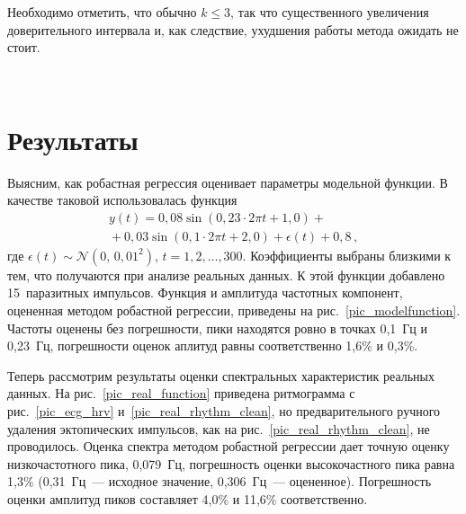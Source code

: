 \begin{multicols}{2}
Необходимо  отметить, что обычно $k\leq 3$, так что существенного
увеличения доверительного интервала и, как следствие, ухудшения
работы метода ожидать не стоит.

\begin{figure*} %
\vspace*{1pt}
\begin{center}
\mbox{%
\epsfxsize=156.767mm
}
\end{center}
\vspace*{-9pt}
\end{figure*}


\section{Результаты}%

Выясним, как робастная регрессия оценивает параметры модельной
функции. В качестве таковой использовалась функция
\begin{multline*}
y(t) = 0{,}08\sin\left ( 0{,}23\cdot2\pi t + 1{,}0\right )+{}\\
{}+ 0{,}03\sin\left ( 0{,}1\cdot2\pi t + 2{,}0 \right) +
\epsilon(t) + 0{,}8\,,
\end{multline*}
где $\epsilon(t)\sim
\mathcal{N}(0,\,0{,}01^2)$, $t = 1,2,\ldots,300$. Коэффициенты выбраны
близкими к тем, что получаются при анализе реальных данных. К этой
функции добавлено 15~паразитных импульсов. Функция и амплитуда
частотных компонент, оцененная методом робастной регрессии,
приведены на рис.~\ref{pic_modelfunction}. Частоты оценены без
погрешности, пики находятся ровно в точках 0,1~Гц и 0,23~Гц,
погрешности оценок аплитуд равны соответственно 1,6\% и 0,3\%.

Теперь рассмотрим результаты оценки спектральных характеристик
реальных данных. На рис.~\ref{pic_real_function} приведена
ритмограмма с рис.~\ref{pic_ecg_hrv} и~\ref{pic_real_rhythm_clean},
но предварительного ручного удаления
эктопических импульсов, как на рис.~\ref{pic_real_rhythm_clean},
не проводилось. Оценка спектра
методом робастной регрессии дает точную оценку низкочастотного
пика, 0,079~Гц, погрешность оценки высокочастного пика равна
1,3\% (0,31~Гц~--- исходное значение, 0,306~Гц~--- оцененное).
Погрешность оценки амплитуд пиков со\-став\-ля\-ет 4,0\% и 11,6\%
соответственно.


\end{multicols}
